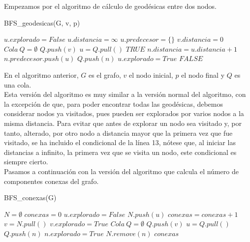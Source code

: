 Empezamos por el algoritmo de cálculo de geodésicas entre dos nodos.

\begin{algorithm}
	\caption{BFS\_geodesicas(G, v, p)}
	\begin{algorithmic}[1]
			\State $u.explorado = False$
			\State $u.distancia = \infty$
			\State $u.predecesor = \{\}$
		\EndFor
		\State $v.distancia = 0$
		\State $Cola\ Q = \emptyset$
		\State $Q.push(v)$
			\State $u = Q.pull()$
					\Return $TRUE$
				\EndIf
							\State $n.distancia = u.distancia + 1$
							\State $n.predecesor.push(u)$
							\State $Q.push(n)$
						\EndIf
					\EndIf
				\EndFor
				\State $u.explorado = True$
			\EndIf
		\EndWhile
		\Return $FALSE$
	\end{algorithmic}
\end{algorithm}

En el algoritmo anterior, $G$ es el grafo, $v$ el nodo inicial, $p$ el nodo final y $Q$ es una cola. \\

Esta versión del algoritmo es muy similar a la versión normal del algoritmo, con la excepción de que, para poder encontrar todas las geodésicas, debemos considerar nodos ya visitados, pues pueden ser explorados por varios nodos a la misma distancia. Para evitar que antes de explorar un nodo sea visitado y, por tanto, alterado, por otro nodo a distancia mayor que la primera vez que fue visitado, se ha incluido el condicional de la línea 13, nótese que, al iniciar las distancias a infinito, la primera vez que se visita un nodo, este condicional es siempre cierto. \\

Pasamos a continuación con la versión del algoritmo que calcula el número de componentes conexas del grafo.

\begin{breakablealgorithm}
	\caption{BFS\_conexas(G)}
	\begin{algorithmic}[1]
		\State $N = \emptyset$
		\State $conexas = 0$
		\For{$u \in G.V$}
			\State $u.explorado = False$
			\State $N.push(u)$
		\EndFor
		\While{$N \neq \emptyset$}
			\State $conexas = conexas + 1$
			\State $v = N.pull()$
			\State $v.explorado = True$
			\State $Cola\ Q = \emptyset$
			\State $Q.push(v)$		
			\While{$Q \neq \emptyset$}
				\State $u = Q.pull()$
				\For{$n \in G.Adj[u]$}
					\If{$!n.explorado$}
						\State $Q.push(n)$
						\State $n.explorado = True$
						\State $N.remove(n)$
					\EndIf
				\EndFor
			\EndWhile
		\EndWhile
		\Return $conexas$
	\end{algorithmic}
\end{breakablealgorithm}

